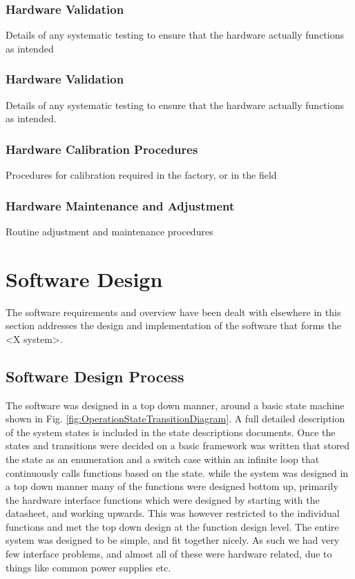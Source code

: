 \documentclass[]{report}
\begin{document}
\subsection{Hardware Validation}
Details of any systematic testing to ensure that the hardware actually functions as intended

\subsection{Hardware Validation}
Details of any systematic testing to ensure that the hardware actually functions as intended.

\subsection{Hardware Calibration Procedures}
Procedures for calibration required in the factory, or in the field

\subsection{Hardware Maintenance and Adjustment}
Routine adjustment and maintenance procedures

\chapter{Software Design}
The software requirements and overview have been dealt with elsewhere in this section addresses the design and implementation of the software that forms the <X system>.

\section{Software Design Process}
The software was designed in a top down manner, around a basic state machine shown in Fig. \ref{fig:OperationStateTransitionDiagram}. A full detailed description of the system states is included in the state descriptions documents. 
Once the states and transitions were decided on a basic framework was written that stored the state as an enumeration and a switch case within an infinite loop that continuously calls functions based on the state. \newline
while the system was designed in a top down manner many of the functions were designed bottom up, primarily the hardware interface functions which were designed by starting with the datasheet, and working upwards. This was however restricted to the individual functions and met the top down design at the function design level. \newline
The entire system was designed to be simple, and fit together nicely. As such we had very few interface problems, and almost all of these were hardware related, due to things like common power supplies etc.
\end{document}
